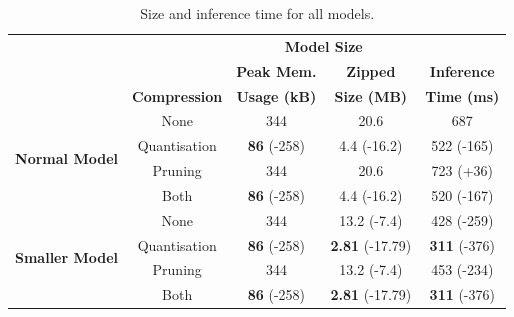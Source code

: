 \documentclass{article}
\begin{document}
{\begin{table}[h]
    \centering
    \begin{tabular}{|c|c|c|c|c|}
        \hline
        \rowcolor{lightgray} & & \multicolumn{2}{|c|}{\textbf{Model Size}} &  \\
        \cline{2-5}
        \rowcolor{lightgray}&  & \textbf{Peak Mem.} & \textbf{Zipped} & \textbf{Inference} \\
        \rowcolor{lightgray}& \multirow{-2}{*}{\cellcolor{lightgray}\textbf{Compression}} & \textbf{Usage (kB)} & \textbf{Size (MB)} & \textbf{Time (ms)} \\
        \hline
        \multirow{4}{*}{\textbf{Normal Model}} & None & 344 & 20.6 & 687 \\
        \cline{2-5}
        & Quantisation & \cellcolor{green!50}\textbf{86} (-258) & \cellcolor{green!30}4.4 (-16.2) & \cellcolor{green!10}522 (-165) \\
        \cline{2-5}
        & Pruning & 344 & 20.6 & \cellcolor{red!10}723 (+36) \\
        \cline{2-5}
        & Both & \cellcolor{green!50}\textbf{86} (-258) & \cellcolor{green!30}4.4 (-16.2) & \cellcolor{green!15}520 (-167) \\
        \hline
        \multirow{4}{*}{\textbf{Smaller Model}} & None & 344 & \cellcolor{green!10}13.2 (-7.4) & \cellcolor{green!30}428 (-259) \\
        \cline{2-5}
        & Quantisation & \cellcolor{green!50}\textbf{86} (-258) & \cellcolor{green!50}\textbf{2.81} (-17.79) & \cellcolor{green!50}\textbf{311} (-376) \\
        \cline{2-5}
        & Pruning & 344 & \cellcolor{green!10}13.2 (-7.4) & \cellcolor{green!25}453 (-234) \\
        \cline{2-5}
        & Both & \cellcolor{green!50}\textbf{86} (-258) & \cellcolor{green!50}\textbf{2.81} (-17.79) & \cellcolor{green!50}\textbf{311} (-376) \\
        \hline
    \end{tabular}
    
    \vspace{2em}
    \caption{Size and inference time for all models.}
    \label{tbl:sizeresults}
\end{table}

}
\end{document}
